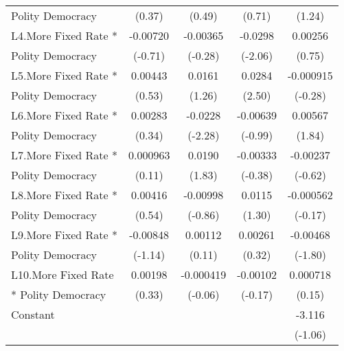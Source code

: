 {\begin{tabular}{l*{4}{c}}
Polity Democracy    &      (0.37)         &      (0.49)         &      (0.71)         &      (1.24)         \\
[1em]
L4.More Fixed Rate *&    -0.00720         &    -0.00365         &     -0.0298\sym{*}  &     0.00256         \\
Polity Democracy    &     (-0.71)         &     (-0.28)         &     (-2.06)         &      (0.75)         \\
[1em]
L5.More Fixed Rate *&     0.00443         &      0.0161         &      0.0284\sym{*}  &   -0.000915         \\
Polity Democracy    &      (0.53)         &      (1.26)         &      (2.50)         &     (-0.28)         \\
[1em]
L6.More Fixed Rate *&     0.00283         &     -0.0228\sym{*}  &    -0.00639         &     0.00567         \\
Polity Democracy    &      (0.34)         &     (-2.28)         &     (-0.99)         &      (1.84)         \\
[1em]
L7.More Fixed Rate *&    0.000963         &      0.0190         &    -0.00333         &    -0.00237         \\
Polity Democracy    &      (0.11)         &      (1.83)         &     (-0.38)         &     (-0.62)         \\
[1em]
L8.More Fixed Rate *&     0.00416         &    -0.00998         &      0.0115         &   -0.000562         \\
Polity Democracy    &      (0.54)         &     (-0.86)         &      (1.30)         &     (-0.17)         \\
[1em]
L9.More Fixed Rate *&    -0.00848         &     0.00112         &     0.00261         &    -0.00468         \\
Polity Democracy    &     (-1.14)         &      (0.11)         &      (0.32)         &     (-1.80)         \\
[1em]
L10.More Fixed Rate &     0.00198         &   -0.000419         &    -0.00102         &    0.000718         \\
* Polity Democracy  &      (0.33)         &     (-0.06)         &     (-0.17)         &      (0.15)         \\
[1em]
Constant            &                     &                     &                     &      -3.116         \\
                    &                     &                     &                     &     (-1.06)         \\

\end{tabular}}
